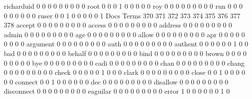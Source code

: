 \documentclass[compress,8pt]{beamer}
\begin{document}
\begin{frame}
\begin{Schunk}
  richarduid                                 0   0   0   0   0   0   0   0   0
  root                                       0   0   0   1   0   0   0   0   0
  roy                                        0   0   0   0   0   0   0   0   0
  run                                        0   0   0   0   0   0   0   0   0
  ruser                                      0   0   1   0   0   0   0   0   1
                                          Docs
Terms                                      370 371 372 373 374 375 376 377 378
  accept                                     0   0   0   0   0   0   0   0   0
  access                                     0   0   0   0   0   0   0   0   0
  address                                    0   0   0   0   0   0   0   0   0
  admin                                      0   0   0   0   0   0   0   0   0
  age                                        0   0   0   0   0   0   0   0   0
  allow                                      0   0   0   0   0   0   0   0   0
  apr                                        0   0   0   0   0   0   0   0   0
  argument                                   0   0   0   0   0   0   0   0   0
  auth                                       0   0   0   0   0   0   0   0   0
  authent                                    0   0   0   0   0   0   1   0   0
  bad                                        0   0   0   0   0   0   0   0   0
  behalf                                     0   0   0   0   0   0   0   0   0
  bind                                       0   0   0   0   0   0   0   0   0
  brown                                      0   0   0   0   0   0   0   0   0
  bye                                        0   0   0   0   0   0   0   0   0
  cadi                                       0   0   0   0   0   0   0   0   0
  chan                                       0   0   0   0   0   0   0   0   0
  chang                                      0   0   0   0   0   0   0   0   0
  check                                      0   0   0   0   0   1   0   0   0
  clark                                      0   0   0   0   0   0   0   0   0
  close                                      0   0   1   0   0   0   0   0   0
  connect                                    0   0   1   0   0   0   0   0   0
  dec                                        0   0   0   0   0   0   0   0   0
  disallow                                   0   0   0   0   0   0   0   0   0
  disconnect                                 0   0   0   0   0   0   0   0   0
  eaguilar                                   0   0   0   0   0   0   0   0   0
  error                                      1   0   0   0   0   0   0   1   0

\end{Schunk}
\end{frame}
\end{document}
